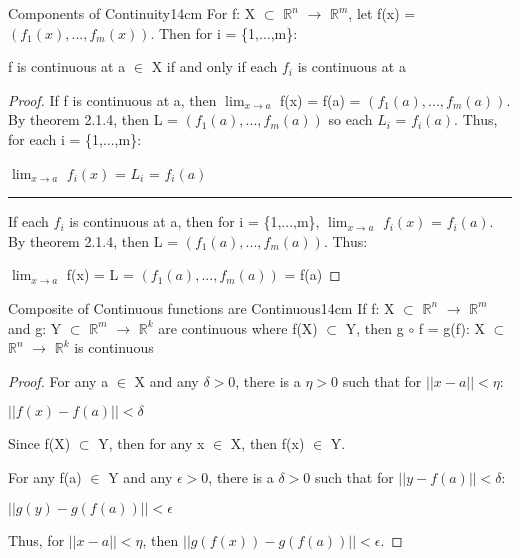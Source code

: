     \vspace{0.5cm}



    \begin{wtheorem}{Components of Continuity}{14cm}
        For f: X $\subset$ $\mathbb{R}^n$ $\rightarrow$ $\mathbb{R}^m$,
        let f(x) = $(f_1(x),...,f_m(x))$. Then for i = \{1,...,m\}:

        \hspace{0.5cm}
        f is continuous at a $\in$ X if and only if each $f_i$ is continuous
        at a
    \end{wtheorem}

    \begin{proof}
        If f is continuous at a, then
        $\lim_{x \rightarrow a}$ f(x) = f(a) = $(f_1(a),...,f_m(a))$.
        By {\color{red} theorem 2.1.4}, then L = $(f_1(a),...,f_m(a))$
        so each $L_i$ = $f_i(a)$. Thus, for each i = \{1,...,m\}:

        \hspace{0.5cm}
        $\lim_{x \rightarrow a}$ $f_i(x)$ = $L_i$ = $f_i(a)$

        \rule[0.1cm]{15cm}{0.01cm}

        If each $f_i$ is continuous at a, then for i = \{1,...,m\},
        $\lim_{x \rightarrow a}$ $f_i(x)$ = $f_i(a)$.
        By {\color{red} theorem 2.1.4}, then L = $(f_1(a),...,f_m(a))$. Thus:

        \hspace{0.5cm}
        $\lim_{x \rightarrow a}$ f(x) = L = $(f_1(a),...,f_m(a))$ = f(a)
    \end{proof}

    \vspace{0.5cm}



    \begin{wtheorem}{Composite of Continuous functions are Continuous}{14cm}
        If f: X $\subset$ $\mathbb{R}^n$ $\rightarrow$ $\mathbb{R}^m$
        and g: Y $\subset$ $\mathbb{R}^m$ $\rightarrow$ $\mathbb{R}^k$
        are continuous where f(X) $\subset$ Y, then g $\circ$ f = g(f):
        X $\subset$ $\mathbb{R}^n$ $\rightarrow$ $\mathbb{R}^k$ is continuous
    \end{wtheorem}

    \begin{proof}
        For any a $\in$ X and any $\delta > 0$,
        there is a $\eta > 0$ such that for $||x-a|| < \eta$:

        \hspace{0.5cm}
        $||f(x) - f(a)|| < \delta$

        Since f(X) $\subset$ Y, then for any x $\in$ X, then f(x) $\in$ Y.

        For any f(a) $\in$ Y and any $\epsilon > 0$,
        there is a $\delta > 0$ such that for $||y-f(a)|| < \delta$:

        \hspace{0.5cm}
        $||g(y) - g(f(a))|| < \epsilon$

        Thus, for $||x-a|| < \eta$, then
        $||g(f(x)) - g(f(a))|| < \epsilon$.
    \end{proof}

